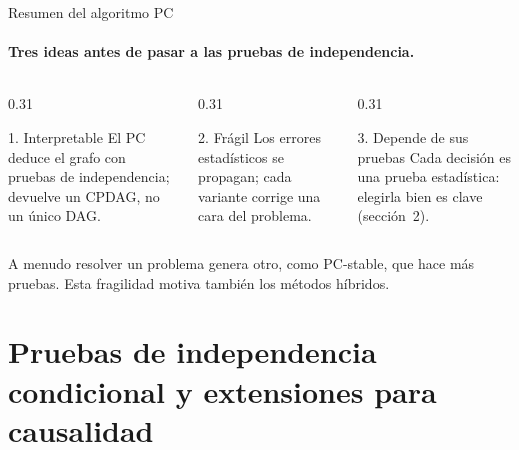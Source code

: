 \documentclass[aspectratio=169,11pt]{beamer}
\begin{document}
\begin{frame}[t]{Resumen del algoritmo PC}
  \framesubtitle{Tres ideas antes de pasar a las pruebas de independencia.}
  \vspace{0.2cm}
  \begin{columns}[T,onlytextwidth]
    \begin{column}{0.31\textwidth}
      \begin{block}{1. Interpretable}
        El PC deduce el grafo con pruebas de independencia; devuelve un CPDAG,
        no un único DAG.
      \end{block}
    \end{column}
    \begin{column}{0.31\textwidth}
      \begin{alertblock}{2. Frágil}
        Los errores estadísticos se propagan; cada variante corrige una cara
        del problema.
      \end{alertblock}
    \end{column}
    \begin{column}{0.31\textwidth}
      \begin{exampleblock}{3. Depende de sus pruebas}
        Cada decisión es una prueba estadística: elegirla bien es clave
        (sección~2).
      \end{exampleblock}
    \end{column}
  \end{columns}
  \vfill
  {\scriptsize\color{upmgray}A menudo resolver un problema genera otro, como
  PC-stable, que hace más pruebas. Esta fragilidad motiva también los
  métodos híbridos.}
\end{frame}

\section[Pruebas de independencia condicional]{Pruebas de independencia condicional y extensiones para causalidad}

\end{document}

